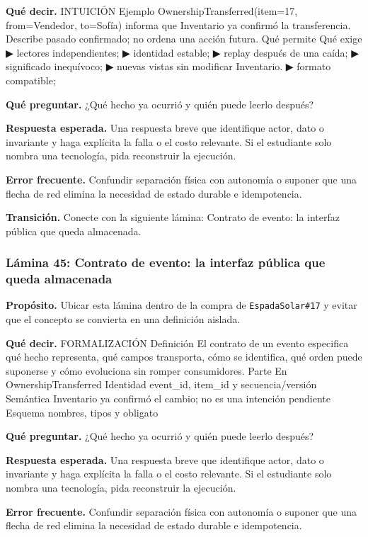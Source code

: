 \documentclass[variant=docente,cover=institutional,mode=screen]{ua-engineering-v6-article}
\begin{document}
\textbf{Qué decir.} INTUICIÓN Ejemplo OwnershipTransferred(item=17, from=Vendedor, to=Sofía) informa que Inventario ya confirmó la transferencia. Describe pasado confirmado; no ordena una acción futura. Qué permite Qué exige ▶ lectores independientes; ▶ identidad estable; ▶ replay después de una caída; ▶ significado inequívoco; ▶ nuevas vistas sin modificar Inventario. ▶ formato compatible;

\textbf{Qué preguntar.} ¿Qué hecho ya ocurrió y quién puede leerlo después?

\textbf{Respuesta esperada.} Una respuesta breve que identifique actor, dato o invariante y haga explícita la falla o el costo relevante. Si el estudiante solo nombra una tecnología, pida reconstruir la ejecución.

\textbf{Error frecuente.} Confundir separación física con autonomía o suponer que una flecha de red elimina la necesidad de estado durable e idempotencia.

\textbf{Transición.} Conecte con la siguiente lámina: Contrato de evento: la interfaz pública que queda almacenada.

\subsubsection*{Lámina 45: Contrato de evento: la interfaz pública que queda almacenada}
\textbf{Propósito.} Ubicar esta lámina dentro de la compra de \texttt{EspadaSolar\#17} y evitar que el concepto se convierta en una definición aislada.

\textbf{Qué decir.} FORMALIZACIÓN Definición El contrato de un evento especifica qué hecho representa, qué campos transporta, cómo se identifica, qué orden puede suponerse y cómo evoluciona sin romper consumidores. Parte En OwnershipTransferred Identidad event\_id, item\_id y secuencia/versión Semántica Inventario ya confirmó el cambio; no es una intención pendiente Esquema nombres, tipos y obligato

\textbf{Qué preguntar.} ¿Qué hecho ya ocurrió y quién puede leerlo después?

\textbf{Respuesta esperada.} Una respuesta breve que identifique actor, dato o invariante y haga explícita la falla o el costo relevante. Si el estudiante solo nombra una tecnología, pida reconstruir la ejecución.

\textbf{Error frecuente.} Confundir separación física con autonomía o suponer que una flecha de red elimina la necesidad de estado durable e idempotencia.
\end{document}
